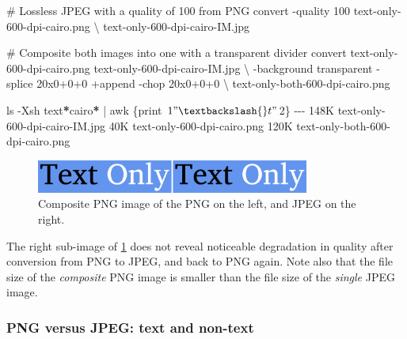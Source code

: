 \documentclass[
  11pt,
  british,
  a4paper,
]{article}
\newenvironment{Shaded}{\begin{snugshade}}{\end{snugshade}}
\newcommand{\AttributeTok}[1]{\textcolor[rgb]{0.80,0.80,0.80}{#1}}
\newcommand{\CommentTok}[1]{\textcolor[rgb]{0.50,0.62,0.50}{#1}}
\newcommand{\DataTypeTok}[1]{\textcolor[rgb]{0.87,0.87,0.75}{#1}}
\newcommand{\ExtensionTok}[1]{\textcolor[rgb]{0.80,0.80,0.80}{#1}}
\newcommand{\FunctionTok}[1]{\textcolor[rgb]{0.94,0.94,0.56}{#1}}
\newcommand{\KeywordTok}[1]{\textcolor[rgb]{0.94,0.87,0.69}{#1}}
\newcommand{\NormalTok}[1]{\textcolor[rgb]{0.80,0.80,0.80}{#1}}
\newcommand{\PreprocessorTok}[1]{\textcolor[rgb]{1.00,0.81,0.69}{\textbf{#1}}}
\newcommand{\StringTok}[1]{\textcolor[rgb]{0.80,0.58,0.58}{#1}}
\begin{document}
\begin{Shaded}
\begin{Highlighting}[]
\CommentTok{\# Lossless JPEG with a \textquotesingle{}quality\textquotesingle{} of 100 from PNG}
\ExtensionTok{convert} \AttributeTok{{-}quality}\NormalTok{ 100 text{-}only{-}600{-}dpi{-}cairo.png }\DataTypeTok{\textbackslash{}}
\NormalTok{text{-}only{-}600{-}dpi{-}cairo{-}IM.jpg}

\CommentTok{\# Composite both images into one with a transparent divider}
\ExtensionTok{convert}\NormalTok{ text{-}only{-}600{-}dpi{-}cairo.png text{-}only{-}600{-}dpi{-}cairo{-}IM.jpg }\DataTypeTok{\textbackslash{}}
\NormalTok{{-}background transparent }\AttributeTok{{-}splice}\NormalTok{ 20x0+0+0 +append }\AttributeTok{{-}chop}\NormalTok{ 20x0+0+0 }\DataTypeTok{\textbackslash{}}
\NormalTok{text{-}only{-}both{-}600{-}dpi{-}cairo.png}

\FunctionTok{ls} \AttributeTok{{-}Xsh}\NormalTok{ text}\PreprocessorTok{*}\NormalTok{cairo}\PreprocessorTok{*} \KeywordTok{|} \FunctionTok{awk} \StringTok{\textquotesingle{}\{print $1 "\textbackslash{}t" $2\}\textquotesingle{}}
\ExtensionTok{{-}{-}{-}}
\ExtensionTok{148K}\NormalTok{    text{-}only{-}600{-}dpi{-}cairo{-}IM.jpg}
\ExtensionTok{40K}\NormalTok{     text{-}only{-}600{-}dpi{-}cairo.png}
\ExtensionTok{120K}\NormalTok{    text{-}only{-}both{-}600{-}dpi{-}cairo.png}
\end{Highlighting}
\end{Shaded}

\begin{figure}
\hypertarget{fig:text-only-both}{%
\centering
\includegraphics[width=0.8\textwidth,height=\textheight]{images/text-only-both-600-dpi-cairo.png}
\caption{Composite PNG image of the PNG on the left, and JPEG on the
right.}\label{fig:text-only-both}
}
\end{figure}

The right sub-image of \cref{fig:text-only-both} does not reveal
noticeable degradation in quality after conversion from PNG to JPEG, and
back to PNG again. Note also that the file size of the \emph{composite}
PNG image is smaller than the file size of the \emph{single} JPEG image.

\hypertarget{png-versus-jpeg-text-and-non-text}{%
\subsubsection{PNG versus JPEG: text and
non-text}\label{png-versus-jpeg-text-and-non-text}}
\end{document}
